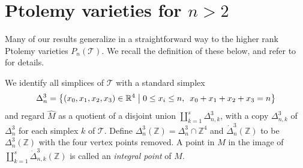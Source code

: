 \documentclass[12pt]{amsart}
\theoremstyle{definition}
\numberwithin{equation}{section}
\def\R{\mathbb{R}}
\def\Z{\mathbb{Z}}
\def\T{\mathcal{T}}
\begin{document}

\section{Ptolemy varieties for $n>2$}\label{sec:HigherPtolemy}
Many of our results generalize in a straightforward way to the higher rank Ptolemy varieties $P_n(\T)$. We recall the definition of these below, and refer to~\cite{GaroufalidisThurstonZickert,GaroufalidisGoernerZickert} for details.

We identify all simplices of $\T$ with a standard simplex
\begin{equation}
\Delta^3_n = \left\{(x_0,x_1,x_2,x_3) \in \R^4\bigm\vert 0\leq x_i \leq n,\enspace x_0 + x_1 + x_2 + x_3 = n\right\}
\end{equation}
and regard $\widehat M$ as a quotient of a disjoint union $\coprod_{k=1}^s\Delta^3_{n,k}$, with a copy $\Delta^3_{n,k}$ of $\Delta^3_n$ for each simplex $k$ of $\T$. Define $\Delta^3_n(\Z)=\Delta^3_n\cap\Z^4$ and $\dot\Delta^3_n(\Z)$ to be $\Delta^3_n(\Z)$ with the four vertex points removed.
A point in $M$ in the image of $\coprod_{k=1}^s\dot\Delta^3_{n,k}(\Z)$ is called an \emph{integral point} of $M$.
\end{document}
